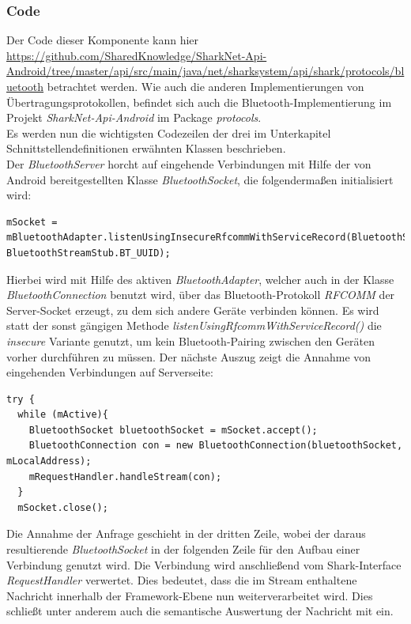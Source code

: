 \subsubsection{Code}
Der Code dieser Komponente kann hier \url{https://github.com/SharedKnowledge/SharkNet-Api-Android/tree/master/api/src/main/java/net/sharksystem/api/shark/protocols/bluetooth} betrachtet werden. Wie auch die anderen Implementierungen von Über\-tra\-gungs\-pro\-to\-kol\-len, befindet sich auch die Bluetooth-Implementierung im Projekt \textit{SharkNet-Api-Android} im Package \textit{protocols}. 
\\Es werden nun die wichtigsten Codezeilen der drei im Unterkapitel Schnittstellendefinitionen erwähnten Klassen beschrieben.
\\Der \textit{BluetoothServer} horcht auf eingehende Verbindungen mit Hilfe der von Android bereitgestellten Klasse \textit{BluetoothSocket}, die folgendermaßen initialisiert wird:
 \lstset{language=Java, caption=Initialisierung des Bluetooth-Server-Sockets, label=DescriptiveLabel, numbers=left, numbersep=1em, breaklines=true, basicstyle=\small}
\begin{lstlisting}
mSocket = mBluetoothAdapter.listenUsingInsecureRfcommWithServiceRecord(BluetoothStreamStub.BT_NAME, BluetoothStreamStub.BT_UUID);
\end{lstlisting}
Hierbei wird mit Hilfe des aktiven \textit{BluetoothAdapter}, welcher auch in der Klasse \textit{BluetoothConnection} benutzt wird, über das Bluetooth-Protokoll \textit{RFCOMM} der Server-Socket erzeugt, zu dem sich andere Geräte verbinden können. Es wird statt der sonst gängigen Methode \textit{listenUsingRfcommWithServiceRecord()} die \textit{insecure} Variante genutzt, um kein Bluetooth-Pairing zwischen den Geräten vorher durchführen zu müssen. Der nächste Auszug zeigt die Annahme von eingehenden Verbindungen auf Serverseite:
 \lstset{language=Java, caption=Serverseitige Annahme der Bluetooth-Verbindungen (Auszug), label=DescriptiveLabel, numbers=left, numbersep=1em, breaklines=true, basicstyle=\small}
\begin{lstlisting}
try {
  while (mActive){
    BluetoothSocket bluetoothSocket = mSocket.accept();
    BluetoothConnection con = new BluetoothConnection(bluetoothSocket, mLocalAddress);
    mRequestHandler.handleStream(con);
  }
  mSocket.close();
\end{lstlisting}
Die Annahme der Anfrage geschieht in der dritten Zeile, wobei der daraus resultierende \textit{BluetoothSocket} in der folgenden Zeile für den Aufbau einer Verbindung genutzt wird. Die Verbindung wird anschließend vom Shark-Interface \textit{RequestHandler} verwertet. Dies bedeutet, dass die im Stream enthaltene Nachricht innerhalb der Framework-Ebene nun weiterverarbeitet wird. Dies schließt unter anderem auch die semantische Auswertung der Nachricht mit ein.
